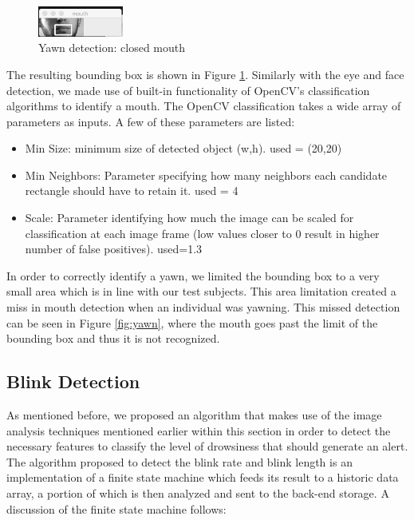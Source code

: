 \documentclass[twocolumn]{article}
\begin{document}
\begin{figure}[H]
\centering
\includegraphics[width=0.25\textwidth]{./closd_mouth1.png}
\caption{Yawn detection: closed mouth}
\label{fig:noyawn}
\end{figure}
The resulting bounding box is shown in Figure \ref{fig:noyawn}. 
Similarly with the eye and face detection, we made use of built-in functionality of OpenCV's classification algorithms to identify a mouth. The OpenCV classification takes a wide array of parameters as inputs. A few of these parameters are listed:
\begin{itemize}
\item Min Size: minimum size of detected object (w,h). used = (20,20)
\item Min Neighbors: Parameter specifying how many neighbors each candidate rectangle should have to retain it. used = 4
\item Scale: Parameter identifying how much the image can be scaled for classification at each image frame (low values closer to 0 result in higher number of false positives). used=1.3
\end{itemize}
In order to correctly identify a yawn, we limited the bounding box to a very small area which is in line with our test subjects. This area limitation created a miss in mouth detection when an individual was yawning. This missed detection can be seen in Figure \ref{fig:yawn}, where the mouth goes past the limit of the bounding box and thus it is not recognized. 
\subsection{Blink Detection}

As mentioned before, we proposed an algorithm that makes use of the image analysis techniques mentioned earlier within this section in order to detect the necessary features to classify the level of drowsiness that should generate an alert. The algorithm proposed to detect the blink rate and blink length is an implementation of a finite state machine which feeds its result to a historic data array, a portion of which is then analyzed and sent to the back-end storage. A discussion of the finite state machine follows: \\
\end{document}
